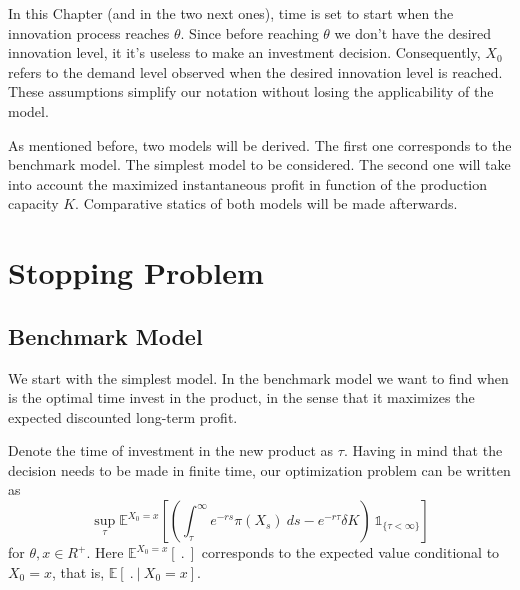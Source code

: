In this Chapter (and in the two next ones), time is set to start when the innovation process reaches $\theta$. Since before reaching $\theta$ we don't have the desired innovation level, it it's useless to make an investment decision. Consequently, $X_0$ refers to the demand level observed when the desired innovation level is reached. These assumptions simplify our notation without losing the applicability of the model.

As mentioned before, two models will be derived. The first one corresponds to the benchmark model. The simplest model to be considered. The second one will take into account the maximized instantaneous profit in function of the production capacity $K$. Comparative statics of both models will be made afterwards.


\section{Stopping Problem}
\label{section:1_theory}



\subsection{Benchmark Model}
\label{subsec:1_bm}

We start with the simplest model. In the benchmark model we want to find when is the optimal time invest in the product, in the sense that it maximizes the expected discounted long-term profit.



Denote the time of investment in the new product as $\tau$. Having in mind that the decision needs to be made in finite time, our optimization problem can be written as 
\begin{equation}
\sup_\tau \mathds{E}^{X_0=x} \left[ \left( \int_\tau^\infty e^{-rs} \pi(X_s)\ ds - e^{-r \tau} \delta K \right) \ \mathds{1}_{\{\tau<\infty\}} \right]
\label{eq:probz}
\end{equation}
for $\theta, x\in R^+$. Here $\mathds{E}^{X_0=x}\left[ \ . \ \right]$ corresponds to the expected value conditional to $X_0=x$, that is, $\mathds{E} \left[ \ . \ | \ X_0=x \right]$.

